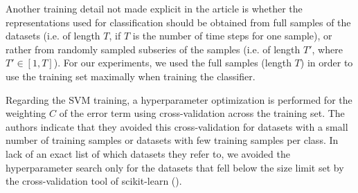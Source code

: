 Another training detail not made explicit in the article is whether the representations used for classification should be obtained from full samples of the datasets (i.e. of length $T$, if $T$ is the number of time steps for one sample), or rather from randomly sampled subseries of the samples (i.e. of length $T'$, where $T' \in [1,T]$). For our experiments, we used the full samples (length $T$) in order to use the training set maximally when training the classifier.

Regarding the SVM training, a hyperparameter optimization is performed for the weighting $C$ of the error term using cross-validation across the training set. The authors indicate that they avoided this cross-validation for datasets with a small number of training samples or datasets with few training samples per class. In lack of an exact list of which datasets they refer to, we avoided the hyperparameter search only for the datasets that fell below the size limit set by the cross-validation tool of scikit-learn (\cite{scikit-learn}).



